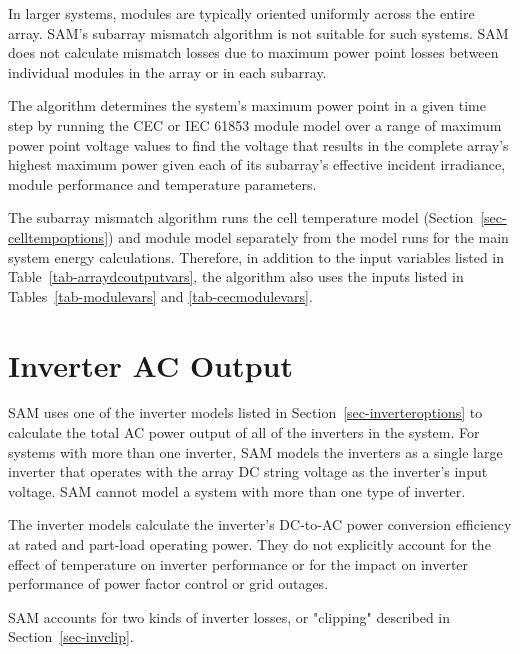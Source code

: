 \documentclass[12pt,letterpaper]{article}
\begin{document}
In larger systems, modules are typically oriented uniformly across the entire array. SAM's subarray mismatch algorithm is not suitable for such systems. SAM does not calculate mismatch losses due to maximum power point losses between individual modules in the array or in each subarray.

The algorithm determines the system's maximum power point in a given time step by running the CEC or IEC 61853 module model over a range of maximum power point voltage values to find the voltage that results in the complete array's highest maximum power given each of its subarray's effective incident irradiance, module performance and temperature parameters.

The subarray mismatch algorithm runs the cell temperature model (Section~\ref{sec-celltempoptions}) and module model separately from the model runs for the main system energy calculations. Therefore, in addition to the input variables listed in Table~\ref{tab-arraydcoutputvars}, the algorithm also uses the inputs listed in Tables~\ref{tab-modulevars} and \ref{tab-cecmodulevars}.

\chapter{Inverter AC Output}\label{sec-inverter}

SAM uses one of the inverter models listed in Section~\ref{sec-inverteroptions} to calculate the total AC power output of all of the inverters in the system. For systems with more than one inverter, SAM models the inverters as a single large inverter that operates with the array DC string voltage as the inverter's input voltage. SAM cannot model a system with more than one type of inverter.

The inverter models calculate the inverter's DC-to-AC power conversion efficiency at rated and part-load operating power. They do not explicitly account for the effect of temperature on inverter performance or for the impact on inverter performance of power factor control or grid outages. 

SAM accounts for two kinds of inverter losses, or "clipping" described in Section~\ref{sec-invclip}.
\end{document}
